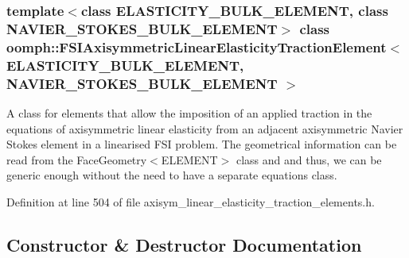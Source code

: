 \subsubsection*{template$<$class E\+L\+A\+S\+T\+I\+C\+I\+T\+Y\+\_\+\+B\+U\+L\+K\+\_\+\+E\+L\+E\+M\+E\+NT, class N\+A\+V\+I\+E\+R\+\_\+\+S\+T\+O\+K\+E\+S\+\_\+\+B\+U\+L\+K\+\_\+\+E\+L\+E\+M\+E\+NT$>$\newline
class oomph\+::\+F\+S\+I\+Axisymmetric\+Linear\+Elasticity\+Traction\+Element$<$ E\+L\+A\+S\+T\+I\+C\+I\+T\+Y\+\_\+\+B\+U\+L\+K\+\_\+\+E\+L\+E\+M\+E\+N\+T, N\+A\+V\+I\+E\+R\+\_\+\+S\+T\+O\+K\+E\+S\+\_\+\+B\+U\+L\+K\+\_\+\+E\+L\+E\+M\+E\+N\+T $>$}

A class for elements that allow the imposition of an applied traction in the equations of axisymmetric linear elasticity from an adjacent axisymmetric Navier Stokes element in a linearised F\+SI problem. The geometrical information can be read from the Face\+Geometry$<$\+E\+L\+E\+M\+E\+N\+T$>$ class and and thus, we can be generic enough without the need to have a separate equations class. 

Definition at line 504 of file axisym\+\_\+linear\+\_\+elasticity\+\_\+traction\+\_\+elements.\+h.



\subsection{Constructor \& Destructor Documentation}
\mbox{\label{classoomph_1_1FSIAxisymmetricLinearElasticityTractionElement_a1c6b3d25b6867c98666130df0a150433}} 
